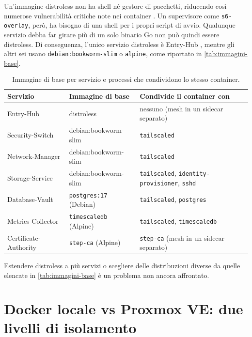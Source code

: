 Un'immagine distroless \cite{distroless-github} non ha shell né gestore di pacchetti, riducendo così
numerose vulnerabilità critiche note nei container \cite{wager2024distroless}.
Un supervisore come \texttt{s6-overlay}, però, ha bisogno di una shell per i propri script di avvio.
Qualunque servizio debba far girare più di un solo binario Go non può quindi essere distroless.
Di conseguenza, l'unico servizio distroless è Entry-Hub \cite{ramusb-code-dockerfile-entry-hub}, mentre 
gli altri sei usano \texttt{debian:bookworm-slim} o \texttt{alpine}, come riportato in 
\autoref{tab:immagini-base}.

\begin{table}[H]
\centering
\caption{Immagine di base per servizio e processi che condividono lo stesso container.}
\label{tab:immagini-base}
\begin{tabular}{@{}l p{} p{}@{}}
\hline
\textbf{Servizio} & \textbf{Immagine di base} & \textbf{Condivide il container con} \\
\hline
Entry-Hub & distroless & nessuno (mesh in un sidecar separato) \\
Security-Switch & debian:bookworm-slim & \texttt{tailscaled} \\
Network-Manager & debian:bookworm-slim & \texttt{tailscaled} \\
Storage-Service & debian:bookworm-slim & \texttt{tailscaled}, \texttt{identity-provisioner}, \texttt{sshd} \\
Database-Vault & \texttt{postgres:17} (Debian) & \texttt{tailscaled}, \texttt{postgres} \\
Metrics-Collector & \texttt{timescaledb} (Alpine) & \texttt{tailscaled}, \texttt{timescaledb} \\
Certificate-Authority & \texttt{step-ca} (Alpine) & \texttt{step-ca} (mesh in un sidecar separato) \\
\hline
\end{tabular}
\end{table}

Estendere distroless a più servizi o scegliere delle distribuzioni diverse da quelle elencate in 
\autoref{tab:immagini-base} è un problema non ancora affrontato.

\section{Docker locale vs Proxmox VE: due livelli di isolamento}
\label{sec:docker-vs-proxmox}

